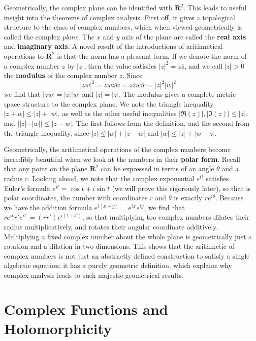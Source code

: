 Geometrically, the complex plane can be identified with $\mathbf{R}^2$. This leads to useful insight into the theorems of complex analysis. First off, it gives a topological structure to the class of complex numbers, which when viewed geometrically is called the complex {\it plane}. The $x$ and $y$ axis of the plane are called the {\bf real axis} and {\bf imaginary axis}. A novel result of the introductions of arithmetical operations to $\mathbf{R}^2$ is that the norm has a pleasant form. If we denote the norm of a complex number $z$ by $|z|$, then the value satisfies $|z|^2 = z\overline{z}$, and we call $|z| > 0$ the {\bf modulus} of the complex number $z$. Since
%
\[ |zw|^2 = zw \overline{zw} = z\overline{z} w \overline{w} = |z|^2|w|^2 \]
%
we find that $|zw| = |z||w|$ and $|\overline{z}| = |z|$. The modulus gives a complete metric space structure to the complex plane. We note the triangle inequality $|z + w| \leq |z| + |w|$, as well as the other useful inequalities $|\Re(z)|, |\Im(z)| \leq |z|$, and $||z| - |w|| \leq |z - w|$. The first follows from the definition, and the second from the triangle inequality, since $|z| \leq |w| + |z - w|$ and $|w| \leq |z| + |w - z|$.

Geometrically, the arithmetical operations of the complex numbers become incredibly beautiful when we look at the numbers in their {\bf polar form}. Recall that any point on the plane $\mathbf{R}^2$ can be expressed in terms of an angle $\theta$ and a radius $r$. Looking ahead, we note that the complex exponential $e^{it}$ satisfies Euler's formula $e^{it} = \cos t + i \sin t$ (we will prove this rigorously later), so that is polar coordinates, the number with coordinates $r$ and $\theta$ is exactly $re^{i\theta}$. Because we have the addition formula $e^{i(x + y)} = e^{ix}e^{iy}$, we find that $re^{it}r'e^{it'} = (rr')e^{i(t + t')}$, so that multiplying too complex numbers dilates their radius multiplicatively, and rotates their angular coordinate additively. Multiplying a fixed complex number about the whole plane is geometrically just a rotation and a dilation in two dimensions. This shows that the arithmetic of complex numbers is not just an abstractly defined construction to satisfy a single algebraic equation; it has a purely geometric definition, which explains why complex analysis leads to such majestic geometrical results.

\section{Complex Functions and Holomorphicity}


